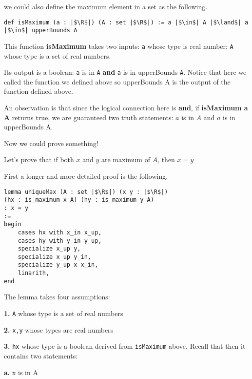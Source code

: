 \documentclass[a4paper]{article}
\newcommand{\R}{\mathbb{R}}
\begin{document}
we could also define the maximum element in a set as the following.

\begin{listing}[!ht]
\begin{verbatim}
def isMaximum (a : |$\R$|) (A : set |$\R$|) := a |$\in$| A |$\land$| a |$\in$| upperBounds A
\end{verbatim}
\end{listing}

This function \textbf{isMaximum} takes two inputs: \texttt{a} whose type is real number; \texttt{A} whose type is a set of real numbers.

Its output is a boolean: \texttt{a} is in \texttt{A}  \textbf{and} \texttt{a} is in upperBounds \texttt{A}. Notice that here we called the function we defined above so upperBounds A is the output of the function defined above.

An observation is that since the logical connection here is \textbf{and}, if \textbf{isMaximum a A} returns true, we are guaranteed two truth statements: $a$ is in  $A$ and  $a$ is in upperBounds A.  

\bigskip

Now we could prove something! 

Let's prove that if both  $x$ and  $y$ are maximum of  $A$, then  $x = y$

First a longer and more detailed proof is the following.

\begin{listing}[!ht]
\begin{verbatim}
lemma uniqueMax (A : set |$\R$|) (x y : |$\R$|) 
(hx : is_maximum x A) (hy : is_maximum y A) 
: x = y 
:= 
begin
	cases hx with x_in x_up,
	cases hy with y_in y_up,
	specialize x_up y,
	specialize x_up y_in,
	specialize y_up x x_in,
	linarith,
end
\end{verbatim}	
\end{listing}

The lemma takes four assumptions: 

\textbf{1. }\texttt{A} whose type is a set of real numbers

\textbf{2. }\texttt{x,y} whose types are real numbers

\textbf{3. }\texttt{hx} whose type is a boolean derived from \texttt{isMaximum} above. Recall that then it contains two statements: 

\quad\textbf{a.} x is in A
\end{document}
